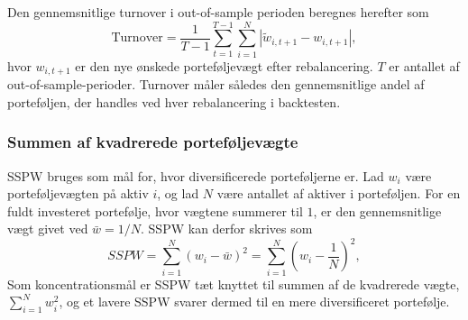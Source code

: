 \documentclass[../main.tex]{subfiles}
\begin{document}
Den gennemsnitlige turnover i out-of-sample perioden beregnes herefter som
\begin{equation}
\mathrm{Turnover}
=
\frac{1}{T-1}
\sum_{t=1}^{T-1}
\sum_{i=1}^{N}
\left|
\tilde{w}_{i,t+1} - w_{i,t+1}
\right|,
\label{eq:turnover}
\end{equation}
hvor $w_{i,t+1}$ er den nye ønskede porteføljevægt efter rebalancering. $T$ er antallet af out-of-sample-perioder. Turnover måler således den gennemsnitlige andel af porteføljen, der handles ved hver rebalancering i backtesten.\cite{demiguel_improving_2007}




\subsubsection{Summen af kvadrerede porteføljevægte}

SSPW bruges som mål for, hvor diversificerede porteføljerne er. Lad $w_i$ være porteføljevægten på aktiv $i$, og lad $N$ være antallet af aktiver i porteføljen. For en fuldt investeret portefølje, hvor vægtene summerer til $1$, er den gennemsnitlige vægt givet ved $\bar{w}=1/N$. SSPW kan derfor skrives som
\begin{equation}
    SSPW = \sum_{i=1}^{N} (w_i - \bar{w})^2 = \sum_{i=1}^{N} \left( w_i - \frac{1}{N} \right)^2,
    \label{eq:sspw}
\end{equation}
Som koncentrationsmål er SSPW tæt knyttet til summen af de kvadrerede vægte, $\sum_{i=1}^{N} w_i^2$, og et lavere SSPW svarer dermed til en mere diversificeret portefølje.
\cite{goetzmann_equity_nodate}
\end{document}
